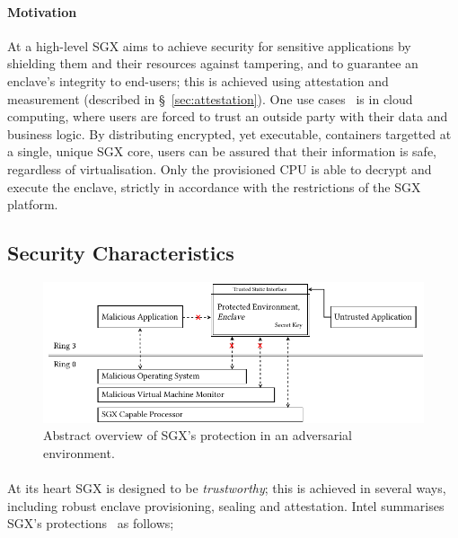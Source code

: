 \paragraph{Motivation} At a high-level SGX aims to achieve security for sensitive applications by shielding them and their resources against tampering, and to guarantee an enclave's integrity to end-users; this is achieved using attestation and measurement (described in §~\ref{sec:attestation}). One use cases~\cite{10.1145/2834050.2834100, 10.1145/2799647, 10.1145/2810103.2813695} is in cloud computing, where users are forced to trust an outside party with their data and business logic. By distributing encrypted, yet executable, containers targetted at a single, unique SGX core, users can be assured that their information is safe, regardless of virtualisation. Only the provisioned CPU is able to decrypt and execute the enclave, strictly in accordance with the restrictions of the SGX platform.

\subsection{Security Characteristics}

\begin{figure}[]
    \centering
    \includegraphics[width=0.95\linewidth]{figures/SGX-architecture.pdf}
    \caption{Abstract overview of SGX's protection in an adversarial environment.}
    \label{fig:sgx-basic}
\end{figure}

\paragraph{} At its heart SGX is designed to be \textit{trustworthy}; this is achieved in several ways, including robust enclave provisioning, sealing and attestation. Intel summarises SGX's protections~\cite{10.1145/2487726.2488368,sgx-eval-sdk} as follows;

